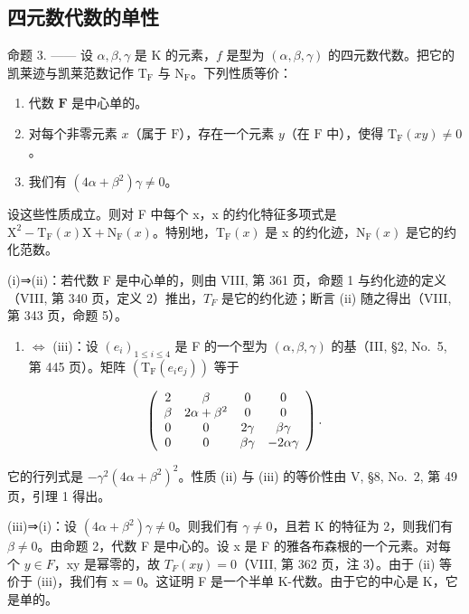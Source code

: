 \subsection{四元数代数的单性}

命题 3. —— 设 \(\alpha, \beta, \gamma\) 是 K 的元素，\(f\) 是型为 \((\alpha, \beta, \gamma)\) 的四元数代数。把它的凯莱迹与凯莱范数记作 \(\mathrm{T}_{\mathrm{F}}\) 与 \(\mathrm{N}_{\mathrm{F}}\)。下列性质等价：

\begin{enumerate}
\def\labelenumi{(\roman{enumi})}
\item
  代数 \(\mathbf{F}\) 是中心单的。
\item
  对每个非零元素 \(x\)（属于 \(\mathrm{F}\)），存在一个元素 \(y\)（在 \(\mathrm{F}\) 中），使得 \(\mathrm{T}_{\mathrm{F}}(xy) \neq 0\)。
\item
  我们有 \((4\alpha + \beta^{2})\gamma \neq 0\)。
\end{enumerate}

设这些性质成立。则对 F 中每个 x，x 的约化特征多项式是 \(\mathrm{X}^{2}-\mathrm{T}_{\mathrm{F}}(x)\mathrm{X}+\mathrm{N}_{\mathrm{F}}(x)\)。特别地，\(\mathrm{T}_{\mathrm{F}}(x)\) 是 x 的约化迹，\(\mathrm{N}_{\mathrm{F}}(x)\) 是它的约化范数。

(i)⇒(ii)：若代数 F 是中心单的，则由 VIII, 第 361 页，命题 1 与约化迹的定义（VIII, 第 340 页，定义 2）推出，\(T_{F}\) 是它的约化迹；断言 (ii) 随之得出（VIII, 第 343 页，命题 5）。

\begin{enumerate}
\def\labelenumi{(\roman{enumi})}
\setcounter{enumi}{1}
\tightlist
\item
  \(\Leftrightarrow\) (iii)：设 \((e_i)_{1\leqslant i\leqslant 4}\) 是 F 的一个型为 \((\alpha ,\beta ,\gamma)\) 的基（III, §2, No.~5, 第 445 页）。矩阵 \((\mathrm{T_F}(e_i e_j))\) 等于
\end{enumerate}

\[
\left( \begin{array}{c c c c} 2 & \beta & 0 & 0 \\ \beta & 2 \alpha + \beta^ {2} & 0 & 0 \\ 0 & 0 & 2 \gamma & \beta \gamma \\ 0 & 0 & \beta \gamma & - 2 \alpha \gamma \end{array} \right).
\]

它的行列式是 \(-\gamma^{2}(4\alpha + \beta^{2})^{2}\)。性质 (ii) 与 (iii) 的等价性由 V, §8, No.~2, 第 49 页，引理 1 得出。

(iii)⇒(i)：设 \((4\alpha + \beta^{2})\gamma \neq 0\)。则我们有 \(\gamma \neq 0\)，且若 K 的特征为 2，则我们有 \(\beta \neq 0\)。由命题 2，代数 F 是中心的。设 x 是 F 的雅各布森根的一个元素。对每个 \(y \in F\)，xy 是幂零的，故 \(T_{F}(xy) = 0\)（VIII, 第 362 页，注 3）。由于 (ii) 等价于 (iii)，我们有 x = 0。这证明 F 是一个半单 K-代数。由于它的中心是 K，它是单的。

